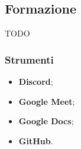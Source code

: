 \subsection{Formazione}
\par TODO

\subsubsection{Strumenti}
\begin{itemize}
  \item \textbf{Discord};
  \item \textbf{Google Meet};
  \item \textbf{Google Docs};
  \item \textbf{GitHub}.
\end{itemize}